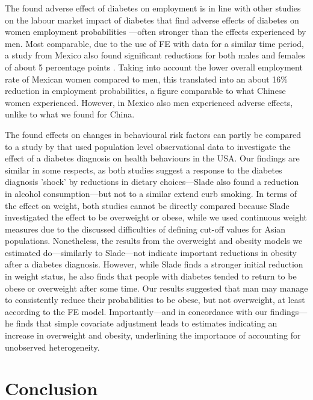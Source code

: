 The found adverse effect of diabetes on employment is in line with other studies on the labour market impact of diabetes that find adverse effects of diabetes on women employment probabilities \parencite{Minor2010,Latif2009,Harris2009,Seuring2016}---often stronger than the effects experienced by men. Most comparable, due to the use of \ac{FE} with data for a similar time period, a study from Mexico also found significant reductions for both males and females of about 5 percentage points \parencite{Seuring2016}. Taking into account the lower overall employment rate of Mexican women compared to men, this translated into an about 16\% reduction in employment probabilities, a figure comparable to what Chinese women experienced. However, in Mexico also men experienced adverse effects, unlike to what we found for China.

The found effects on changes in behavioural risk factors can partly be compared to a study by \parencite{Slade2012} that used population level observational data to investigate the effect of a diabetes diagnosis on health behaviours in the USA. Our findings are similar in some respects, as both studies suggest a response to the diabetes diagnosis 'shock' by reductions in dietary choices---Slade also found a reduction in alcohol consumption---but not to a similar extend curb smoking. In terms of the effect on weight, both studies cannot be directly compared because Slade investigated the effect to be overweight or obese, while we used continuous weight measures due to the discussed difficulties of defining cut-off values for Asian populations. Nonetheless, the results from the overweight and obesity models we estimated do---similarly to Slade---not indicate important reductions in obesity after a diabetes diagnosis. However, while Slade finds a stronger initial reduction in weight status, he also finds that people with diabetes tended to return to be obese or overweight after some time. Our results suggested that man may manage to consistently reduce their probabilities to be obese, but not overweight, at least according to the \ac{FE} model. Importantly---and in concordance with our findings---he finds that simple covariate adjustment leads to estimates indicating an increase in overweight and obesity, underlining the importance of accounting for unobserved heterogeneity.



\section{Conclusion}

